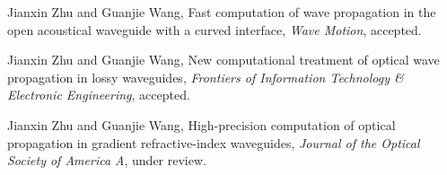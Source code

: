\begin{publications}{99}

\item  Jianxin Zhu and Guanjie Wang, Fast computation of wave propagation in the open
acoustical waveguide with a curved interface,  {\em Wave Motion}, accepted.
\item  Jianxin Zhu and Guanjie Wang,
New computational treatment of optical wave propagation
in lossy waveguides,
{\em Frontiers of Information Technology \& Electronic Engineering}, accepted.

\item Jianxin Zhu and Guanjie Wang, High-precision computation of optical propagation in gradient refractive-index waveguides, {\em Journal of the Optical Society of America A}, under review.

\end{publications}